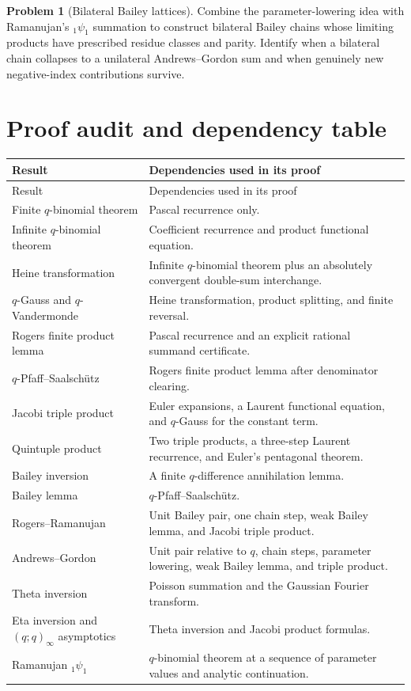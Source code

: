 \documentclass[11pt]{article}
\numberwithin{equation}{section}
\theoremstyle{definition}
\newtheorem{problem}[theorem]{Problem}
\theoremstyle{remark}
\begin{document}
\begin{problem}[Bilateral Bailey lattices]\label{prob:bilateral}
Combine the parameter-lowering idea with Ramanujan's ${}_1\psi_1$ summation to
construct bilateral Bailey chains whose limiting products have prescribed
residue classes and parity.  Identify when a bilateral chain collapses to a
unilateral Andrews--Gordon sum and when genuinely new negative-index
contributions survive.
\end{problem}

\section{Proof audit and dependency table}

\begin{longtable}{>{\raggedright\arraybackslash}p{}
                  >{\raggedright\arraybackslash}p{}}
\toprule
Result & Dependencies used in its proof\\
\midrule
\endfirsthead
\toprule
Result & Dependencies used in its proof\\
\midrule
\endhead
Finite $q$-binomial theorem & Pascal recurrence only.\\
Infinite $q$-binomial theorem & Coefficient recurrence and product
functional equation.\\
Heine transformation & Infinite $q$-binomial theorem plus an absolutely
convergent double-sum interchange.\\
$q$-Gauss and $q$-Vandermonde & Heine transformation, product splitting, and
finite reversal.\\
Rogers finite product lemma & Pascal recurrence and an explicit rational
summand certificate.\\
$q$-Pfaff--Saalsch\"utz & Rogers finite product lemma after denominator
clearing.\\
Jacobi triple product & Euler expansions, a Laurent functional equation, and
$q$-Gauss for the constant term.\\
Quintuple product & Two triple products, a three-step Laurent recurrence, and
Euler's pentagonal theorem.\\
Bailey inversion & A finite $q$-difference annihilation lemma.\\
Bailey lemma & $q$-Pfaff--Saalsch\"utz.\\
Rogers--Ramanujan & Unit Bailey pair, one chain step, weak Bailey lemma, and
Jacobi triple product.\\
Andrews--Gordon & Unit pair relative to $q$, chain steps, parameter lowering,
weak Bailey lemma, and triple product.\\
Theta inversion & Poisson summation and the Gaussian Fourier transform.\\
Eta inversion and $(q;q)_\infty$ asymptotics & Theta inversion and Jacobi
product formulas.\\
Ramanujan ${}_1\psi_1$ & $q$-binomial theorem at a sequence of parameter
values and analytic continuation.\\
\bottomrule
\end{longtable}
\end{document}

